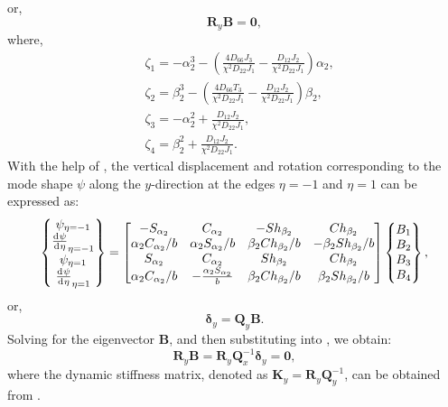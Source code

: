 \documentclass[preprint,12pt,number]{elsarticle}
\newcommand{\id}{\mathrm{d}\mkern1mu}
\begin{document}
%
or,
%
\begin{equation}\label{eq:ABy1}
\mathbf{R}_y \mathbf{B} = \mathbf{0},
\end{equation}
%
where,
%
\begin{equation}\label{eq:gammay}
\begin{split}
	&\zeta_1=-\alpha_2^3-\left( \frac{4D_{66}J_3}{\chi^2D_{22}J_1}  - \frac{D_{12}J_2}{\chi^2D_{22}J_1}  \right)\alpha_2,\\
	&\zeta_2=\beta_2^3-\left( \frac{4D_{66}T_3}{\chi^2D_{22}J_1}  - \frac{D_{12}J_2}{\chi^2D_{22}J_1}  \right)\beta_2,\\
	&\zeta_3=-\alpha_2^2+\frac{D_{12}J_2}{\chi^2D_{22}J_1},\\
	&\zeta_4=\beta_2^2+\frac{D_{12}J_2}{\chi^2D_{22}J_1}.
\end{split}
\end{equation}
%
With the help of , the vertical displacement and rotation corresponding to the mode shape $\psi$ along the $y$-direction at the edges $\eta = -1$ and $\eta = 1$ can be expressed as:
%
\begin{equation}\label{eq:UBy}
\begin{split}
	\begin{Bmatrix}
		\psi_{\eta=-1}\\\frac{\id \psi}{\id \eta}_{\eta=-1}\\\psi_{\eta=1}\\\frac{\id \psi}{\id \eta}_{\eta=1}
	\end{Bmatrix}
	= \begin{bmatrix}
		-S_{\alpha_2} & C_{\alpha_2} & -Sh_{\beta_2} & Ch_{\beta_2} \\
		\alpha_2 C_{\alpha_2}/b & \alpha_2 S_{\alpha_2}/b & \beta_2 Ch_{\beta_2}/b & -\beta_2 Sh_{\beta_2}/b \\
		S_{\alpha_2} & C_{\alpha_2} & Sh_{\beta_2} & Ch_{\beta_2} \\
		\alpha_2 C_{\alpha_2}/b & -\frac{\alpha_2 S_{\alpha_2}}{b} & \beta_2 Ch_{\beta_2}/b & \beta_2 Sh_{\beta_2}/b
	\end{bmatrix}
	\begin{Bmatrix}
		B_1\\B_2\\B_3\\B_4
	\end{Bmatrix},		
\end{split}
\end{equation}
%
or,
%
\begin{equation}\label{eq:UBy1}
\mathbf{\delta}_y= \mathbf{Q}_y\mathbf{B}.
\end{equation}
%
Solving for the eigenvector $\mathbf{B}$, and then substituting into , we obtain:
%
\begin{equation}\label{eq:DSM_eqy}
\mathbf{R}_y\mathbf{B}=\mathbf{R}_y \mathbf{Q}_x^{-1} 
\mathbf{\delta}_y = \mathbf{0},
\end{equation}
%
where the dynamic stiffness matrix, denoted as $\mathbf{K}_y = \mathbf{R}_y \mathbf{Q}_y^{-1}$, can be obtained from .
\end{document}
